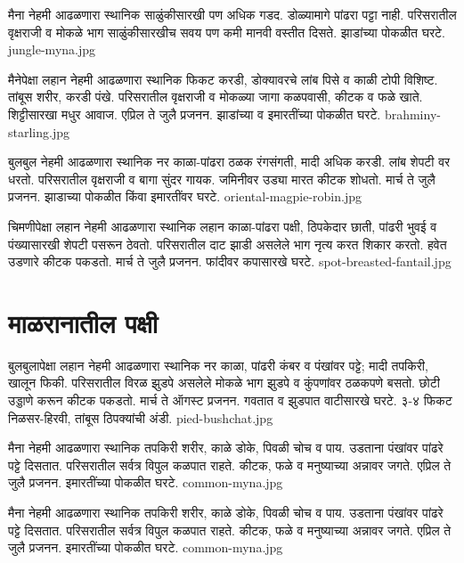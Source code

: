 \documentclass[aspectratio=169]{beamer}
\begin{document}
{मैना}
{नेहमी आढळणारा स्थानिक}
{साळुंकीसारखी पण अधिक गडद. डोळ्यामागे पांढरा पट्टा नाही.}
{परिसरातील वृक्षराजी व मोकळे भाग}
{साळुंकीसारखीच सवय पण कमी मानवी वस्तीत दिसते.}
{झाडांच्या पोकळीत घरटे.}
{jungle-myna.jpg}

{मैनेपेक्षा लहान}
{नेहमी आढळणारा स्थानिक}
{फिकट करडी, डोक्यावरचे लांब पिसे व काळी टोपी विशिष्ट. तांबूस शरीर, करडी पंखे.}
{परिसरातील वृक्षराजी व मोकळ्या जागा}
{कळपवासी, कीटक व फळे खाते. शिट्टीसारखा मधुर आवाज.}
{एप्रिल ते जुलै प्रजनन. झाडांच्या व इमारतींच्या पोकळीत घरटे.}
{brahminy-starling.jpg}

{बुलबुल}
{नेहमी आढळणारा स्थानिक}
{नर काळा-पांढरा ठळक रंगसंगती, मादी अधिक करडी. लांब शेपटी वर धरतो.}
{परिसरातील वृक्षराजी व बागा}
{सुंदर गायक. जमिनीवर उड्या मारत कीटक शोधतो.}
{मार्च ते जुलै प्रजनन. झाडाच्या पोकळीत किंवा इमारतींवर घरटे.}
{oriental-magpie-robin.jpg}

{चिमणीपेक्षा लहान}
{नेहमी आढळणारा स्थानिक}
{लहान काळा-पांढरा पक्षी, ठिपकेदार छाती, पांढरी भुवई व पंख्यासारखी शेपटी पसरून ठेवतो.}
{परिसरातील दाट झाडी असलेले भाग}
{नृत्य करत शिकार करतो. हवेत उडणारे कीटक पकडतो.}
{मार्च ते जुलै प्रजनन. फांदीवर कपासारखे घरटे.}
{spot-breasted-fantail.jpg}

\section{माळरानातील पक्षी}
{बुलबुलापेक्षा लहान}
{नेहमी आढळणारा स्थानिक}
{नर काळा, पांढरी कंबर व पंखांवर पट्टे; मादी तपकिरी, खालून फिकी.}
{परिसरातील विरळ झुडपे असलेले मोकळे भाग}
{झुडपे व कुंपणांवर ठळकपणे बसतो. छोटी उड्डाणे करून कीटक पकडतो.}
{मार्च ते ऑगस्ट प्रजनन. गवतात व झुडपात वाटीसारखे घरटे. ३-४ फिकट निळसर-हिरवी, तांबूस ठिपक्यांची अंडी.}
{pied-bushchat.jpg}

{मैना}
{नेहमी आढळणारा स्थानिक}
{तपकिरी शरीर, काळे डोके, पिवळी चोच व पाय. उडताना पंखांवर पांढरे पट्टे दिसतात.}
{परिसरातील सर्वत्र विपुल}
{कळपात राहते. कीटक, फळे व मनुष्याच्या अन्नावर जगते.}
{एप्रिल ते जुलै प्रजनन. इमारतींच्या पोकळीत घरटे.}
{common-myna.jpg}

{मैना}
{नेहमी आढळणारा स्थानिक}
{तपकिरी शरीर, काळे डोके, पिवळी चोच व पाय. उडताना पंखांवर पांढरे पट्टे दिसतात.}
{परिसरातील सर्वत्र विपुल}
{कळपात राहते. कीटक, फळे व मनुष्याच्या अन्नावर जगते.}
{एप्रिल ते जुलै प्रजनन. इमारतींच्या पोकळीत घरटे.}
{common-myna.jpg}
\end{document}
